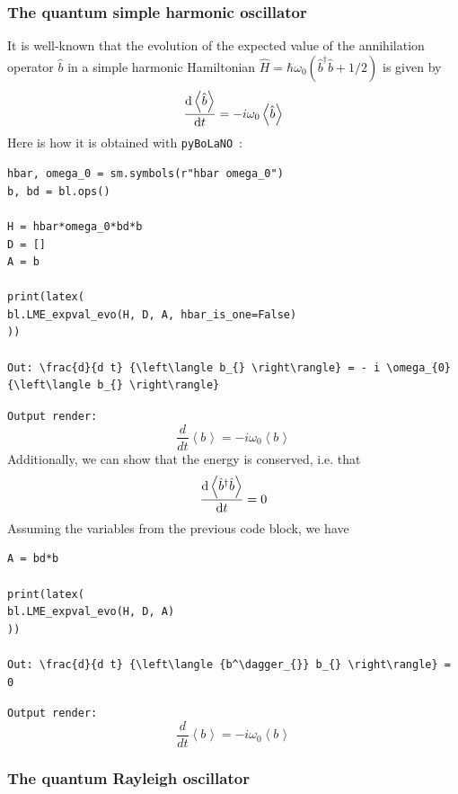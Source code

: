 \documentclass[5p, twocolumn, 10pt, sort&compress]{elsarticle}
\newcommand{\inlinecode}[1]{\texttt{#1}}
\newcommand{\expval}[1]{\left\langle{#1}\right\rangle}
\newcommand{\bop}{\hat{b}}
\newcommand{\bdag}{\bop^\dagger}
\newcommand{\pybolano}{\texttt{pyBoLaNO}~}
\newenvironment{revision2}{%
\color{red}
}
{}
\begin{document}
\subsubsection{The quantum simple harmonic oscillator}

It is well-known that the evolution of the expected value of the annihilation operator $\bop$ in a simple harmonic Hamiltonian $\hat{H} = \hbar\omega_0\left(\bdag\bop+1/2\right)$ is given by
\begin{equation}
    \odv{\expval{\bop}}{t} = -i\omega_0\expval{\bop}
\end{equation}
Here is how it is obtained with \pybolano:
\begin{verbatim}
hbar, omega_0 = sm.symbols(r"hbar omega_0")
b, bd = bl.ops()

H = hbar*omega_0*bd*b
D = []
A = b

print(latex(
bl.LME_expval_evo(H, D, A, hbar_is_one=False)
))

Out: \frac{d}{d t} {\left\langle b_{} \right\rangle} = - i \omega_{0} {\left\langle b_{} \right\rangle}
\end{verbatim}
\begin{revision2}
\noindent\noindent\inlinecode{Output render:}
\begin{equation*}
    \frac{d}{d t} {\left\langle b_{} \right\rangle} = - i \omega_{0} {\left\langle b_{} \right\rangle}
\end{equation*}
\end{revision2}
Additionally, we can show that the energy is conserved, i.e. that
\begin{equation}
    \odv{\expval{\bdag\bop}}{t} = 0
\end{equation}
\noindent Assuming the variables from the previous code block, we have
\begin{verbatim}
A = bd*b

print(latex(
bl.LME_expval_evo(H, D, A)
))

Out: \frac{d}{d t} {\left\langle {b^\dagger_{}} b_{} \right\rangle} = 0
\end{verbatim}
\begin{revision2}
\noindent\noindent\inlinecode{Output render:}
\begin{equation*}
    \frac{d}{d t} {\left\langle b_{} \right\rangle} = - i \omega_{0} {\left\langle b_{} \right\rangle}
\end{equation*}
\end{revision2}

\subsubsection{The quantum Rayleigh oscillator}
\end{document}
